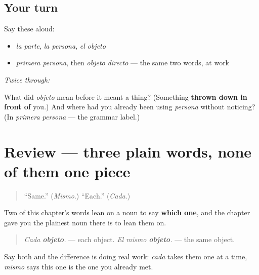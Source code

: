 \subsection*{Your turn}
Say these aloud:

\begin{itemize}
\raggedright
  \item \emph{la parte}, \emph{la persona}, \emph{el objeto}
  \item \emph{primera persona}, then \emph{objeto directo} — the same two words, at work
\end{itemize}

\emph{Twice through:}

\begin{tcolorbox}[breakable,colback=teal!4,colframe=teal!35!black,title={Before you move on}]
What did \emph{objeto} mean before it meant a thing? (Something \textbf{thrown down in front of} you.) And where had you already been using \emph{persona} without noticing? (In \emph{primera persona} — the grammar label.)
\end{tcolorbox}
\section[(review)]{Review — three plain words, none of them one piece}

\label{lesson:ES-C345-repaso-cada-mismo-objeto}



\begin{quote}
\textquotedblleft{}Same.\textquotedblright{} (\emph{Mismo}.) \textquotedblleft{}Each.\textquotedblright{} (\emph{Cada}.)
\end{quote}

\begin{grammarlens}[title={What you've built}]
Two of this chapter's words lean on a noun to say \textbf{which one}, and the chapter gave you the plainest noun there is to lean them on.

\begin{quote}
\emph{Cada \textbf{objeto}.} — each object. \emph{El mismo \textbf{objeto}.} — the same object.
\end{quote}

Say both and the difference is doing real work: \emph{cada} takes them one at a time, \emph{mismo} says this one is the one you already met.
\end{grammarlens}

